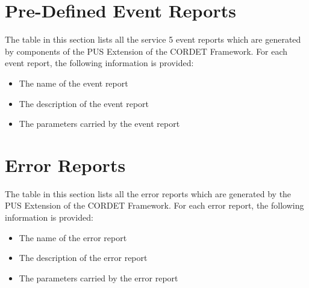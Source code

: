 \documentclass{pnp_article}
\begin{document}
\newpage
\appendix
\section{Pre-Defined Event Reports}\label{sec:preDefEvtRep}
The table in this section lists all the service 5 event reports which are generated by components of the PUS Extension of the CORDET Framework. For each event report, the following information is provided:

\begin{itemize}
\item The name of the event report
\item The description of the event report
\item The parameters carried by the event report
\end{itemize}

\begin{landscape} 


\end{landscape}


\section{Error Reports}\label{sec:errRep}
The table in this section lists all the error reports which are generated by the PUS Extension of the CORDET Framework. For each error report, the following information is provided:

\begin{itemize}
\item The name of the error report
\item The description of the error report
\item The parameters carried by the error report
\end{itemize}

\begin{landscape} 




\end{landscape}
\end{document}
